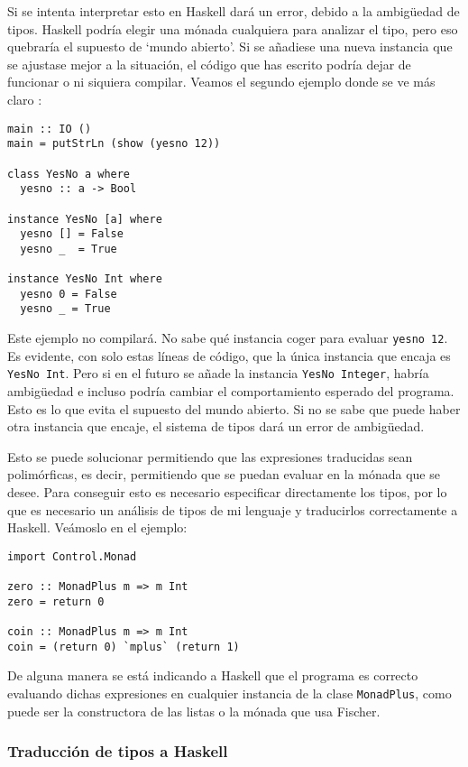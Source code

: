 \documentclass[class=article, crop=false]{standalone}
\begin{document}
Si se intenta interpretar esto en Haskell dará un error, debido a la ambigüedad de tipos.
Haskell podría elegir una mónada cualquiera para analizar el tipo, pero eso quebraría el
supuesto de `mundo abierto'. Si se añadiese una nueva instancia que se ajustase mejor a la
situación, el código que has escrito podría dejar de funcionar o ni siquiera compilar. Veamos
el segundo ejemplo donde se ve más claro \cite{Lipovaca:2011:LYH:2018642}:

\begin{verbatim}
main :: IO ()
main = putStrLn (show (yesno 12))

class YesNo a where
  yesno :: a -> Bool
  
instance YesNo [a] where
  yesno [] = False
  yesno _  = True

instance YesNo Int where
  yesno 0 = False
  yesno _ = True
\end{verbatim}

Este ejemplo no compilará. No sabe qué instancia coger para evaluar \verb`yesno 12`. Es
evidente, con solo estas líneas de código, que la única instancia que encaja es
\verb`YesNo Int`. Pero si en el futuro se añade la instancia \verb`YesNo Integer`, habría
ambigüedad e incluso podría cambiar el comportamiento esperado del programa. Esto es lo que
evita el supuesto del mundo abierto. Si no se sabe que puede haber otra instancia que encaje,
el sistema de tipos dará un error de ambigüedad.

Esto se puede solucionar permitiendo que las expresiones traducidas sean polimórficas, es
decir, permitiendo que se puedan evaluar en la mónada que se desee. Para conseguir esto es
necesario especificar directamente los tipos, por lo que es necesario un análisis de tipos de
mi lenguaje y traducirlos correctamente a Haskell. Veámoslo en el ejemplo:

\begin{verbatim}
import Control.Monad

zero :: MonadPlus m => m Int
zero = return 0

coin :: MonadPlus m => m Int
coin = (return 0) `mplus` (return 1)
\end{verbatim}

De alguna manera se está indicando a Haskell que el programa es correcto evaluando dichas
expresiones en cualquier instancia de la clase \verb`MonadPlus`, como puede ser la
constructora de las listas o la mónada que usa Fischer.

\subsubsection{Traducción de tipos a Haskell}
\end{document}
